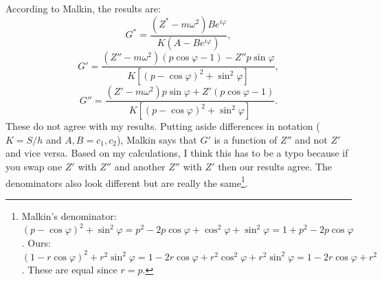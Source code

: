\documentclass[12pt, a4paper]{article}
\numberwithin{equation}{section}
\begin{document}
According to Malkin, the results are:
\[
	G^* = \frac{(Z^* - m\omega^2)Be^{i\varphi}}{K(A-Be^{i\varphi})},
\]
\[
	G' = \frac{(Z''- m\omega^2)(p\cos\varphi-1)-Z'' p\sin\varphi}{K[(p-\cos\varphi)^2 +\sin^2\varphi]},
\]
\[
	G'' = \frac{(Z' - m\omega^2)p\sin\varphi + Z'(p\cos\varphi - 1)}{K[(p-\cos\varphi)^2 +\sin^2\varphi]}.
\]
These do not agree with my results.
Putting aside differences in notation ($K = S/h$ and $A, B = c_1, c_2$), Malkin says 
that $G'$ is a function of $Z''$ and not $Z'$ and vice versa. Based on my 
calculations, I think this has to be a typo because if you swap one $Z'$ with $Z''$ 
and another $Z''$ with $Z'$ then our results agree. The denominators also look different 
but are really the same\footnote{
Malkin's denominator: $(p - \cos\varphi)^2 + \sin^2\varphi = p^2 - 2p\cos\varphi + \cos^2\varphi + \sin^2\varphi = 1 + p^2 - 2p\cos\varphi$.
Ours: $(1 - r\cos\varphi)^2 + r^2\sin^2\varphi = 1 - 2r\cos\varphi + r^2\cos^2\varphi + r^2\sin^2\varphi = 1 - 2r\cos\varphi + r^2$. These are equal since $r = p$.
}.
\end{document}
